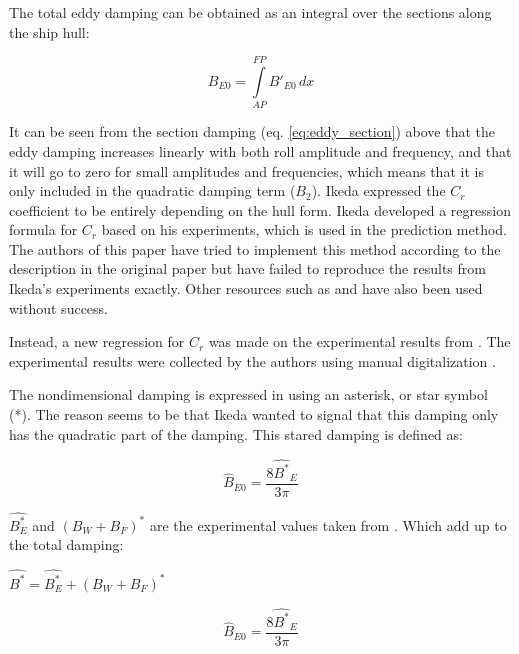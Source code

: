     

    The total eddy damping can be obtained as an integral over the sections
along the ship hull:
 
            
    
    \begin{equation}
B_{E0} = \int\limits_{AP}^{FP} B'_{E0}\, dx
\label{eq:equation}
\end{equation}

    

    It can be seen from the section damping (eq.
\ref{eq:eddy_section}) above that the eddy damping increases
linearly with both roll amplitude and frequency, and that it will go to
zero for small amplitudes and frequencies, which means that it is only
included in the quadratic damping term ($B_2$). Ikeda expressed the
$C_r$ coefficient to be entirely depending on the hull form. Ikeda
developed a regression formula for $C_r$ based on his experiments,
which is used in the prediction method. The authors of this paper have
tried to implement this method according to the description in the
original paper \citep{7505983/4AFVVGNT} but have failed to reproduce the
results from Ikeda's experiments exactly. Other resources such as
\citep{7505983/FB64RGPF} and \citep{7505983/KAKIM2E2} have also been used
without success.

Instead, a new regression for $C_r$ was made on the experimental
results from \citep{7505983/4AFVVGNT}. The experimental results were
collected by the authors using manual digitalization
\citep{7505983/RXYIE6UW}.

    The nondimensional damping is expressed in \citep{7505983/4AFVVGNT} using
an asterisk, or star symbol (*). The reason seems to be that Ikeda
wanted to signal that this damping only has the quadratic part of the
damping. This stared damping is defined as:
 
            
    
    \begin{equation}
\hat{B}_{E0} = \frac{8 \hat{B^*}_{E}}{3 \pi}
\label{eq:equation}
\end{equation}

    

    $\hat{B_E^*}$ and $(B_W+B_F)^*$ are the experimental values taken
from \citep{7505983/4AFVVGNT}. Which add up to the total damping:

    $\hat{B^*} = \hat{B^*_E} + (B_W+B_F)^*$
 
            
    
    \begin{equation}
\hat{B}_{E0} = \frac{8 \hat{B^*}_{E}}{3 \pi}
\label{eq:equation}
\end{equation}

